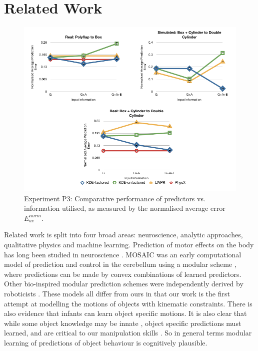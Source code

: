 \section{Related Work}\label{sec:Background}

\begin{figure}[t]
\centerline{\includegraphics[width=\columnwidth]{graphs_jw/P3-graphs}}
\caption{Experiment P3: Comparative performance of predictors vs. information utilised, as measured by the normalised average error ${E_{av}^{norm}}$. 
}\label{fig:S_av_graphs}
\end{figure}

Related work is split into four broad areas: neuroscience, analytic approaches, qualitative physics and machine learning. Prediction of motor effects on the body has long been studied in neuroscience \cite{Miall1996,Flanagan2003}.  MOSAIC was an early computational model of prediction and control in the cerebellum using a modular scheme \cite{Haruno_MOSAIC_2008}, where predictions can be made by convex combinations of learned predictors. Other bio-inspired modular prediction schemes were independently derived by roboticists \cite{demiris2006hierarchical}. These models all differ from ours in that our work is the first attempt at modelling the motions of objects with kinematic constraints. There is also evidence that infants can learn object specific motions\cite{Bahrick1995}. It is also clear that while some object knowledge may be innate \cite{spelke1994early}, object specific predictions must learned, and are critical to our manipulation skills \cite{Flanagan2006}. So in general terms modular learning of predictions of object behaviour is cognitively plausible.

